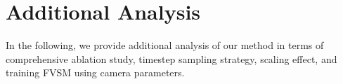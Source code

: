 










         







\section{Additional Analysis}
In the following, we provide additional analysis of our method in terms of comprehensive ablation study, timestep sampling strategy, scaling effect, and training FVSM using camera parameters.

